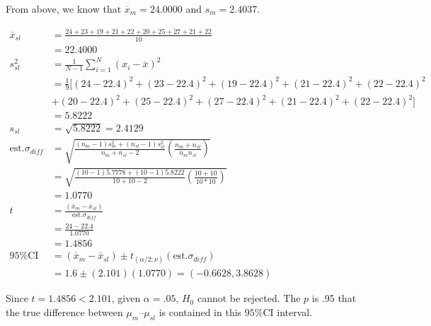 \documentclass[onecolumn,10pt]{jhwhw}
\begin{document}
From above, we know that $\overline{x}_m = 24.0000$ and $s_m = 2.4037$.

\begin{equation*}
\begin{split}
\overline{x}_{sl} & = \frac{24 + 23 + 19 + 21 + 22 + 20 + 25 + 27 + 21 + 22}{10} \\
             & = 22.4000 \\
s^2_{sl} & = \frac{1}{N-1} \sum_{i=1}^N (x_i - \overline{x})^2 \\
    & = \frac{1}{9} [(24-22.4)^2 + (23-22.4)^2 + (19-22.4)^2 + (21-22.4)^2 + (22-22.4)^2  \\
    & + (20-22.4)^2 + (25-22.4)^2 + (27-22.4)^2 + (21-22.4)^2 + (22-22.4)^2] \\
    & = 5.8222 \\
s_{sl} & = \sqrt{5.8222} = 2.4129\\
\mbox{est.} \sigma_{diff} & = \sqrt{\frac{(n_m-1)s^2_m + (n_{sl}-1)s^2_{sl}}{n_m + n_{sl} - 2} \left( \frac{n_m + n_{sl}}{n_m n_{sl}} \right)} \\
& = \sqrt{\frac{(10-1)5.7778 + (10-1)5.8222}{10 + 10 - 2} \left( \frac{10 + 10}{10*10} \right)} \\
& = 1.0770\\
t & = \frac{\left( \overline{x}_m - \overline{x}_{sl} \right)}{\mbox{est.} \sigma_{diff}} \\
  & = \frac{24 - 22.4}{1.0770} \\
  & = 1.4856\\
\mbox{95\% CI} & = (\overline{x}_m - \overline{x}_{sl}) \pm t_{(\alpha/2;\nu)} (\mbox{est.} \sigma_{diff}) \\
& = 1.6 \pm (2.101) (1.0770) = (-0.6628,3.8628)
\end{split}
\end{equation*}

Since $t = 1.4856 < 2.101$, given $\alpha = .05$, $H_0$ cannot be rejected. The $p$ is .95 that the true difference between $\mu_m – \mu_{sl}$ is contained in this $\mbox{95\% CI}$ interval.
\end{document}
